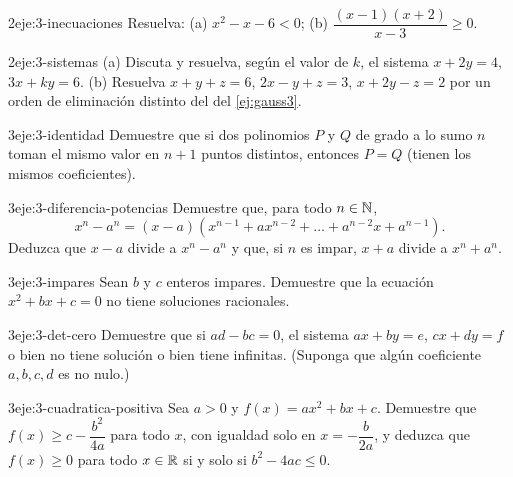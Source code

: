 \begin{ejercicio}{2}{eje:3-inecuaciones}
Resuelva: (a) $x^2-x-6<0$; (b) $\dfrac{(x-1)(x+2)}{x-3}\ge0$.
\end{ejercicio}

\begin{ejercicio}{2}{eje:3-sistemas}
(a) Discuta y resuelva, según el valor de $k$, el sistema $x+2y=4$, $3x+ky=6$. (b) Resuelva $x+y+z=6$, $2x-y+z=3$, $x+2y-z=2$ por un orden de eliminación distinto del del \cref{ej:gauss3}.
\end{ejercicio}

\begin{ejercicio}{3}{eje:3-identidad}
Demuestre que si dos polinomios $P$ y $Q$ de grado a lo sumo $n$ toman el mismo valor en $n+1$ puntos distintos, entonces $P=Q$ (tienen los mismos coeficientes).
\end{ejercicio}

\begin{ejercicio}{3}{eje:3-diferencia-potencias}
Demuestre que, para todo $n\in\mathbb{N}$,
\[
x^n-a^n=(x-a)(x^{n-1}+ax^{n-2}+\dots+a^{n-2}x+a^{n-1}).
\]
Deduzca que $x-a$ divide a $x^n-a^n$ y que, si $n$ es impar, $x+a$ divide a $x^n+a^n$.
\end{ejercicio}

\begin{ejercicio}{3}{eje:3-impares}
Sean $b$ y $c$ enteros impares. Demuestre que la ecuación $x^2+bx+c=0$ no tiene soluciones racionales.
\end{ejercicio}

\begin{ejercicio}{3}{eje:3-det-cero}
Demuestre que si $ad-bc=0$, el sistema $ax+by=e$, $cx+dy=f$ o bien no tiene solución o bien tiene infinitas. (Suponga que algún coeficiente $a,b,c,d$ es no nulo.)
\end{ejercicio}

\begin{ejercicio}{3}{eje:3-cuadratica-positiva}
Sea $a>0$ y $f(x)=ax^2+bx+c$. Demuestre que $f(x)\ge c-\dfrac{b^2}{4a}$ para todo $x$, con igualdad solo en $x=-\dfrac{b}{2a}$, y deduzca que $f(x)\ge0$ para todo $x\in\mathbb{R}$ si y solo si $b^2-4ac\le0$.
\end{ejercicio}

